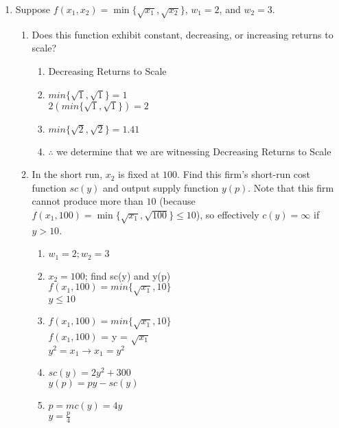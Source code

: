 \documentclass[11pt]{article}
\begin{document}
\begin{enumerate}
\pagebreak
\item Suppose $f(x_{1},x_{2})=\min\{\sqrt{x_{1}},\sqrt{x_{2}}\}$, $w_{1}=2$, and $w_{2}=3$.
    \begin{enumerate}
        \item Does this function exhibit constant, decreasing, or increasing returns to scale?
        \begin{enumerate}
            \item Decreasing Returns to Scale
            \item $min\{\sqrt{1}, \sqrt{1}\} = 1$\\
            $2(min\{\sqrt{1}, \sqrt{1}\}) = 2$
            \item $min\{\sqrt{2}, \sqrt{2}\} = 1.41$
            \item $\therefore$ we determine that we are witnessing Decreasing Returns to Scale
        \end{enumerate}

        \item In the short run, $x_{2}$ is fixed at $100$. Find this firm's short-run cost function $sc(y)$ and output supply function $y(p)$. Note that this firm cannot produce more than $10$ (because $f(x_{1},100)=\min\{\sqrt{x_{1}},\sqrt{100}\}\leq 10$), so effectively $c(y)=\infty$ if $y>10$.
        \begin{enumerate}
            \item $w_1 = 2; w_2 = 3$
            \item $x_2 = 100$; find sc(y) and y(p)\\
            $f(x_1, 100) = min\{\sqrt{x_1}, 10\}$\\
            $y \leq 10$
            \item $f(x_1, 100) = min\{\sqrt{x_1}, 10\}$\\
            $f(x_1, 100)$ = y = $\sqrt{x_1}$\\
            $y^2 = x_1 \rightarrow x_1 = y^2$
            \item $sc(y) = 2y^2 + 300$\\
            $y(p) = py - sc(y)$
            \item $p = mc(y) = 4y$\\
            $y = \frac{p}{4}$
            
        \end{enumerate}


\end{enumerate}
\end{enumerate}
\end{document}
